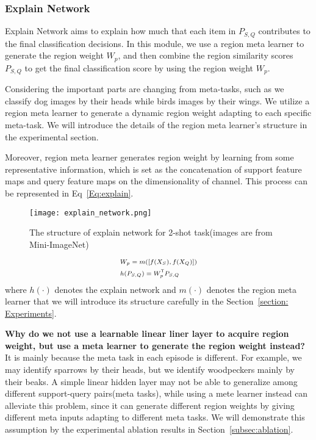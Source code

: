 \documentclass[letterpaper]{article}
\begin{document}
\subsubsection{Explain Network}\label{subsubsection:explain}
Explain Network aims to explain how much that each item in $P_{S,Q}$ contributes to the final classification decisions. In this module, we use a region meta learner to generate the region weight $W_{p}$, and then combine the region similarity scores $P_{S,Q}$ to get the final classification score by using the region weight $W_{p}$.

Considering the important parts are changing from meta-tasks, such as we classify dog images by their heads while birds images by their wings. We utilize a region meta learner to generate a dynamic region weight adapting to each specific meta-task. We will introduce the details of the region meta learner's structure in the experimental section.

Moreover, region meta learner generates region weight by learning from some representative information, which is set as the concatenation of support feature maps and query feature maps on the dimensionality of channel. This process can be represented in Eq~\ref{Eq:explain}.


\begin{figure}
    \centering
    \texttt{[image: explain\_network.png]}
    \caption{The structure of explain network for 2-shot task(images are from Mini-ImageNet)}
    \label{fig:explain}
\end{figure}

\begin{equation}\scriptsize
\begin{aligned}
&W_{p} = m([f(X_S),f(X_Q)]) \label{Eq:explain}\\
&h(P_{S,Q}) = W^{\mathsf{T}}_{p}P_{S,Q}
\end{aligned}
\end{equation}
where $h(\cdot)$ denotes the explain network and $m(\cdot)$ denotes the region meta learner that we will introduce its structure carefully in the Section~\ref{section: Experiments}. 


{\bf Why do we not use a learnable linear liner layer to acquire region weight, but use a meta learner to generate the region weight instead?} It is mainly because the meta task in each episode is different. For example, we may identify sparrows by their heads, but we identify woodpeckers mainly by their beaks. A simple linear hidden layer may not be able to generalize among different support-query pairs(meta tasks), while using a mete learner instead can alleviate this problem, since it can generate different region weights by giving different meta inputs adapting to different meta tasks. We will demonstrate this assumption by the experimental ablation results in Section~\ref{subsec:ablation}. 
\end{document}
